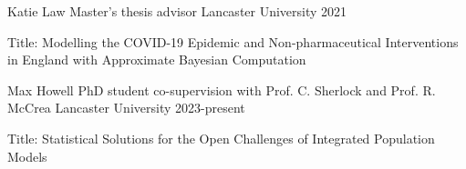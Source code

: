 


\begin{cvhonors}

  \cvhonor
    {Katie Law} %
    {Master's thesis advisor} %
    {Lancaster University} %
    {2021} %

    \extracvhonor
    {Title: }
    {Modelling the COVID-19 Epidemic and Non-pharmaceutical Interventions in England with Approximate Bayesian Computation}
    {}
    {}

\end{cvhonors}

\begin{cvhonors}

  \cvhonor
    {Max Howell} %
    {PhD student co-supervision with Prof. C. Sherlock and Prof. R. McCrea} %
    {Lancaster University} %
    {2023-present} %

    \extracvhonor
    {Title: }
    {Statistical Solutions for the Open Challenges of Integrated Population Models}
    {}
    {}

\end{cvhonors}
